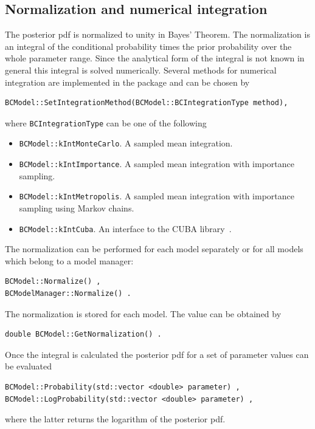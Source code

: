 \documentclass[11pt, a4paper]{article}
\begin{document}

\subsection{Normalization and numerical integration} 
\label{section:normalization} 

The posterior pdf is normalized to unity in Bayes' Theorem. The
normalization is an integral of the conditional probability times the
prior probability over the whole parameter range. Since the analytical
form of the integral is not known in general this integral is solved
numerically. Several methods for numerical integration are implemented
in the package and can be chosen by
%
\begin{verbatim}
BCModel::SetIntegrationMethod(BCModel::BCIntegrationType method), 
\end{verbatim} 

\noindent
where \verb|BCIntegrationType| can be one of the following 
% 
\begin{itemize}
\item \verb|BCModel::kIntMonteCarlo|. A sampled mean integration.
\item \verb|BCModel::kIntImportance|. A sampled mean integration
 with importance sampling.  
\item \verb|BCModel::kIntMetropolis|. A sampled mean integration
 with importance sampling using Markov chains. 
\item \verb|BCModel::kIntCuba|. An interface to the CUBA
  library~\cite{CUBA,CUBAweb}.
\end{itemize}

\noindent 
The normalization can be performed for each model separately or for
all models which belong to a model manager:
%
\begin{verbatim}
BCModel::Normalize() ,
BCModelManager::Normalize() .
\end{verbatim} 

\noindent 
The normalization is stored for each model. The value can be obtained
by
%
\begin{verbatim}
double BCModel::GetNormalization() . 
\end{verbatim}

\noindent 
Once the integral is calculated the posterior pdf for a set of
parameter values can be evaluated
%
\begin{verbatim} 
BCModel::Probability(std::vector <double> parameter) , 
BCModel::LogProbability(std::vector <double> parameter) , 
\end{verbatim} 
%
where the latter returns the logarithm of the posterior pdf.
\end{document}
